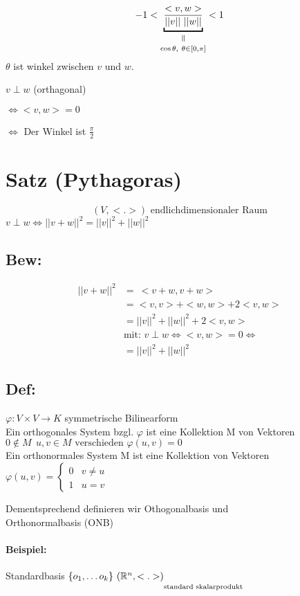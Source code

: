 \documentclass[titlepage,12pt,a4paper,ngerman]{report}
\newcommand{\verteq}{\rotatebox{90}{$\,=$}}
\newcommand{\equalto}[2]{\underset{\scriptstyle\overset{\mkern4mu\verteq}{#2}}{#1}}
\newcommand{\tx}[1]{\textrm{#1}}
\newcommand{\casess}[4]{\left\{ \begin{array}{ll} {#1} & {#2} \\ {#3} & {#4} \end{array} \right.}
\begin{document}
$$-1 < \equalto{\underbracket{\frac{<v,w>}{||v||\ ||w||}}}{ \cos \theta ,\ \theta \in [0, \pi]}<1$$
$\theta$ ist winkel zwischen $v$ und $w$.
\begin{trivlist}
	\item $v \perp w$ (orthagonal) 
	\item $\Leftrightarrow <v,w> = 0$
	\item $\Leftrightarrow$ Der Winkel ist $\frac{\pi}{2}$
\end{trivlist}

\section{Satz (Pythagoras)}
$$(V, <.>) \tx{ endlichdimensionaler Raum}$$
$v \perp w \Leftrightarrow ||v + w||^2 = ||v||^2 + ||w||^2$

\subsection{Bew:}
\begin{align*}
||v+w||^2 &=\  <v+w,v+w> \ \\ 
&= <v,v>+<w,w> + 2<v,w>\\
&= ||v||^2 + ||w||^2 + 2 <v,w> \\
&\tx{mit: } v\perp w \Leftrightarrow <v,w> = 0 \Leftrightarrow \\
&= ||v||^2 + ||w||^2
\end{align*}
\subsection{Def:}
$ \varphi:V\times V \to K $ symmetrische Bilinearform\\
Ein orthogonales System bzgl. $ \varphi $ ist eine Kollektion M von Vektoren $ 0 \notin M \ \ u,v \in M \tx{ verschieden } \varphi(u,v) = 0 $\\
Ein orthonormales System M ist eine Kollektion von Vektoren\\ $ \varphi(u,v) = \casess{0}{v\neq u}{1}{u=v} $

Dementsprechend definieren wir Othogonalbasis und \\ 
Orthonormalbasis (ONB)
\paragraph{Beispiel:}
Standardbasis $\{o_1, \dots o_k \}\ (\mathbb R^n, \underset{\scriptstyle}{<.>)}_{\tx{standard skalarprodukt}}$
\end{document}
